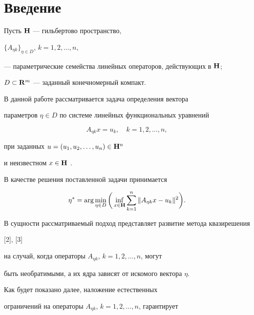 \label{begin}





\section*{Введение}





Пусть ${\bold H}$ --- гильбертово пространство,


$\{A_{\eta k}\}_{\eta \in D}$, $k=1,2,\dotsc, n$,


--- параметрические семейства линейных операторов, действующих в ${\bold H}$;


$D\subset \bold R^m$ --- заданный конечномерный компакт.


В данной работе рассматривается задача определения вектора


параметров $\eta \in D$ по системе линейных функциональных уравнений 


\begin{equation}


\label{set}


A_{\eta k}x=u_k,\quad k=1,2,\dotsc,n, 


\end{equation}


при заданных $u=( u_1,u_2,\dotsc,u_n) \in {\bold H}^n$


и неизвестном $x\in {\bold H}$ \cite{Panyukov}.


В качестве решения поставленной задачи принимается


\begin{equation}


\label{prb}


\eta ^{*}=\arg \min_{\eta \in D}\bigg( \inf_{x\in {\bold H}}


\sum_{k=1}^n\| A_{\eta k}x-u_k\| ^2\bigg).


\end{equation}


В сущности рассматриваемый подход представляет развитие метода квазирешения


[2], [3]


на случай, когда операторы $A_{\eta k}$, $k=1,2,\dotsc,n$, могут 


быть необратимыми, а их ядра зависят от искомого вектора $\eta$.


Как будет показано далее, наложение естественных


ограничений на операторы $A_{\eta k}$, $k=1,2,\dotsc, n$, гарантирует



